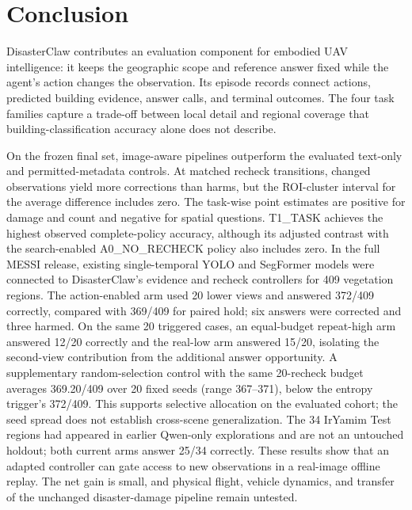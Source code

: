 \section{Conclusion}
DisasterClaw contributes an evaluation component for embodied UAV intelligence: it keeps the geographic scope and reference answer fixed while the agent's action changes the observation. Its episode records connect actions, predicted building evidence, answer calls, and terminal outcomes. The four task families capture a trade-off between local detail and regional coverage that building-classification accuracy alone does not describe.

On the frozen final set, image-aware pipelines outperform the evaluated text-only and permitted-metadata controls. At matched recheck transitions, changed observations yield more corrections than harms, but the ROI-cluster interval for the average difference includes zero. The task-wise point estimates are positive for damage and count and negative for spatial questions. T1\_TASK achieves the highest observed complete-policy accuracy, although its adjusted contrast with the search-enabled A0\_NO\_RECHECK policy also includes zero. In the full MESSI release, existing single-temporal YOLO and SegFormer models were connected to DisasterClaw's evidence and recheck controllers for 409 vegetation regions. The action-enabled arm used 20 lower views and answered 372/409 correctly, compared with 369/409 for paired hold; six answers were corrected and three harmed. On the same 20 triggered cases, an equal-budget repeat-high arm answered 12/20 correctly and the real-low arm answered 15/20, isolating the second-view contribution from the additional answer opportunity. A supplementary random-selection control with the same 20-recheck budget averages 369.20/409 over 20 fixed seeds (range 367--371), below the entropy trigger's 372/409. This supports selective allocation on the evaluated cohort; the seed spread does not establish cross-scene generalization. The 34 IrYamim Test regions had appeared in earlier Qwen-only explorations and are not an untouched holdout; both current arms answer 25/34 correctly. These results show that an adapted controller can gate access to new observations in a real-image offline replay. The net gain is small, and physical flight, vehicle dynamics, and transfer of the unchanged disaster-damage pipeline remain untested.
